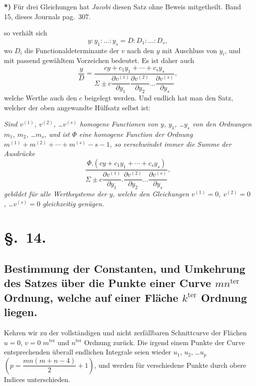 \documentclass{article}
\begin{document}
\textbf{*)} Für drei Gleichungen hat \emph{Jacobi} diesen Satz ohne Beweis mitgetheilt. Band 15, dieses Journals pag.\ 307.

so verhält sich
\[
y:y_{1}:\ldots:y_{s} = D:D_{1}:\ldots:D_{s},
\]
wo $D_{i}$ die Functionaldeterminante der $v$ nach den $y$ mit Auschluss von $y_{i}$, und mit passend gewähltem Vorzeichen bedeutet. Es ist daher auch
\[
\frac{y}{D} = \frac{cy+c_{1}y_{1}+\cdots+c_{s}y_{s}}{\Sigma\pm c\dfrac{\partial v^{(1)}}{\partial y_{1}}\dfrac{\partial v^{(2)}}{\partial y_{2}}\ldots\dfrac{\partial v^{(s)}}{\partial y_{s}}},
\]
welche Werthe auch den $c$ beigelegt werden. Und endlich hat man den Satz, welcher der oben angewandte Hülfsatz selbst ist:

\emph{Sind $v^{(1)}$, $v^{(2)}$, \ldots $v^{(s)}$ homogene Functionen von $y$, $y_{1}$, \ldots $y_{s}$ von den Ordnungen $m_{1}$, $m_{2}$, \ldots $m_{s}$, und ist $\Phi$ eine homogene Function der Ordnung $m^{(1)}+m^{(2)}+\cdots+m^{(s)}-s-1$, so verschwindet immer die Summe der Ausdrücke}
\[
\frac{\Phi.(cy+c_{1}y_{1}+\cdots+c_{s}y_{s})}{\Sigma\pm c\dfrac{\partial v^{(1)}}{\partial y_{1}}.\dfrac{\partial v^{(2)}}{\partial y_{2}}\ldots\dfrac{\partial v^{(s)}}{\partial y_{s}}},
\]
\emph{gebildet für alle Werthsysteme der $y$, welche den Gleichungen $v^{(1)}=0$, $v^{(2)}=0$, \ldots $v^{(s)}=0$ gleichzeitig genügen.}

\section*{§.~14.}

\subsection*{Bestimmung der Constanten, und Umkehrung des Satzes über die Punkte einer Curve $mn^{\text{ter}}$ Ordnung, welche auf einer Fläche $k^{\text{ter}}$ Ordnung liegen.}

Kehren wir zu der vollständigen und nicht zerfällbaren Schnittcurve der Flächen $u=0$, $v=0$ $m^{\text{ter}}$ und $n^{\text{ter}}$ Ordnung zurück. Die irgend einem Punkte der Curve entsprechenden überall endlichen Integrale seien wieder $u_{1}$, $u_{2}$, \ldots $u_{p}$ $\left(p=\dfrac{mn(m+n-4)}{2}+1\right)$, und werden für verschiedene Punkte durch obere Indices unterschieden.
\end{document}
